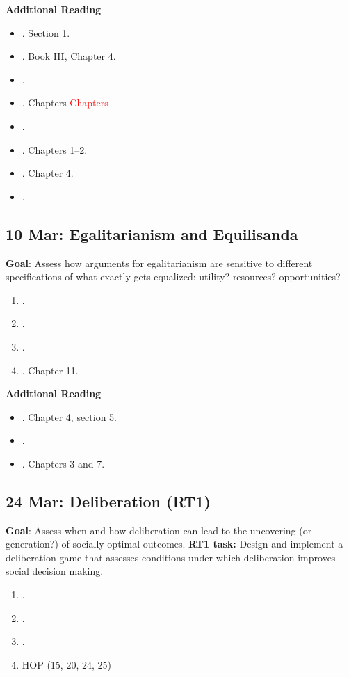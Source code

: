 \documentclass[11pt]{article}
\begin{document}
\textbf{Additional Reading}
\begin{itemize}
\item {}. Section 1.
\item {}. Book III, Chapter 4.
\item {}.
\item {}. Chapters \textcolor{red}{Chapters}
\item {}.
\item {}. Chapters 1--2.
\item {}. Chapter 4.
\item {}.
\end{itemize}


\subsection{10 Mar: Egalitarianism and Equilisanda}
\textbf{Goal}: Assess how arguments for egalitarianism are sensitive to different specifications of what exactly gets equalized: utility? resources? opportunities?  
\begin{enumerate}
\item {}.
\item {}.
\item {}.
\item {}. Chapter 11.
\end{enumerate}

\textbf{Additional Reading}
\begin{itemize}
\item {}. Chapter 4, section 5.
\item {}.
\item {}. Chapters 3 and 7.
\end{itemize}


\subsection{24 Mar: Deliberation (RT1)}
\textbf{Goal}: Assess when and how deliberation can lead to the uncovering (or generation?) of socially optimal outcomes. \textbf{RT1 task:} Design and implement a deliberation game that assesses conditions under which deliberation improves social decision making.
\begin{enumerate}
\item {}.
\item {}.
\item {}.
\item HOP (15, 20, 24, 25)
\end{enumerate}
\end{document}

